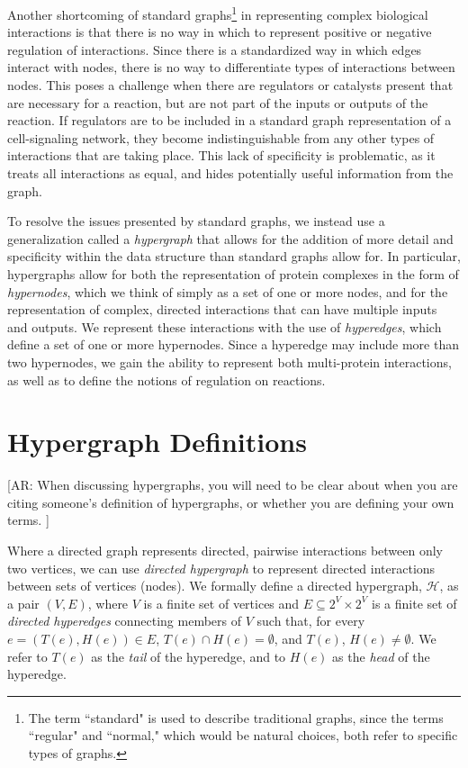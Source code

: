 \documentclass[12pt,twoside]{reedthesis}
\newcommand{\anna}[1]{{\color{blue}[AR: #1]}}
\begin{document}
Another shortcoming of standard graphs\footnote{The term ``standard" is used to describe traditional graphs, since the terms ``regular" and ``normal," which would be natural choices, both refer to specific types of graphs.} in representing complex biological interactions is that there is no way in which to represent positive or negative regulation of interactions.  Since there is a standardized way in which edges interact with nodes, there is no way to differentiate types of interactions between nodes.  This poses a challenge when there are regulators or catalysts present that are necessary for a reaction, but are not part of the inputs or outputs of the reaction.  If regulators are to be included in a standard graph representation of a cell-signaling network, they become indistinguishable from any other types of interactions that are taking place.  This lack of specificity is problematic, as it treats all interactions as equal, and hides potentially useful information from the graph.

To resolve the issues presented by standard graphs, we instead use a generalization called a \textit{hypergraph} that allows for the addition of more detail  and specificity within the data structure than standard graphs allow for.  In particular, hypergraphs allow for both the representation of protein complexes in the form of \textit{hypernodes}, which we think of simply as a set of one or more nodes, and for the representation of complex, directed interactions that can have multiple inputs and outputs.  We represent these interactions with the use of \textit{hyperedges}, which define a set of one or more hypernodes.  Since a hyperedge may include more than two hypernodes, we gain the ability to represent both multi-protein interactions, as well as to define the notions of regulation on reactions.

\section{Hypergraph Definitions}

\anna{When discussing hypergraphs, you will need to be clear about when you are citing someone's definition of hypergraphs, or whether you are defining your own terms. }

Where a directed graph represents directed, pairwise interactions between only two vertices, we can use \textit{directed hypergraph} to represent directed interactions between sets of vertices (nodes). We formally define a directed hypergraph, $\mathcal{H}$, as a pair $(V,E)$, where $V$ is a finite set of vertices and $E \subseteq 2^V \times 2^V$ is a finite set of \textit{directed hyperedges} connecting members of $V$ such that, for every $e=(T(e),H(e)) \in E$, $T(e) \cap H(e) = \emptyset$, and $T(e)$, $H(e) \neq \emptyset$.  We refer to $T(e)$ as the \textit{tail} of the hyperedge, and to $H(e)$ as the \textit{head} of the hyperedge.
\end{document}
